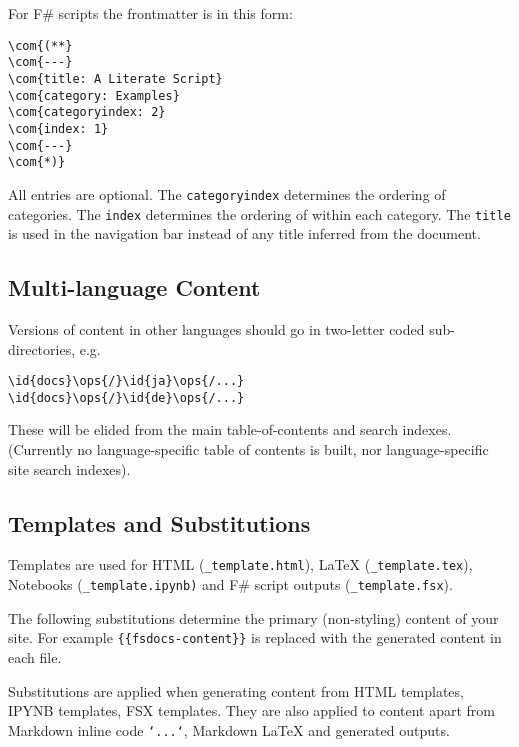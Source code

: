 \documentclass{article}
\newcommand{\id}[1]{\textcolor{black}{#1}}
\newcommand{\com}[1]{\textcolor{officegreen}{#1}}
\newcommand{\ops}[1]{\textcolor{purple}{#1}}
\begin{document}
For F\# scripts the frontmatter is in this form:
\begin{Verbatim}[commandchars=\\\{\}]
\com{(**}
\com{---}
\com{title: A Literate Script}
\com{category: Examples}
\com{categoryindex: 2}
\com{index: 1}
\com{---}
\com{*)}

\end{Verbatim}



All entries are optional.
The \texttt{categoryindex} determines the ordering of categories.
The \texttt{index} determines the ordering of within each category.
The \texttt{title} is used in the navigation bar instead of any title inferred from the document.
\subsection*{Multi-language Content}



Versions of content in other languages should go in two-letter coded sub-directories, e.g.
\begin{Verbatim}[commandchars=\\\{\}]
\id{docs}\ops{/}\id{ja}\ops{/...}
\id{docs}\ops{/}\id{de}\ops{/...}

\end{Verbatim}



These will be elided from the main table-of-contents and search indexes.  (Currently no language-specific
table of contents is built, nor language-specific site search indexes).
\subsection*{Templates and Substitutions}



Templates are used for HTML (\texttt{\_template.html}), LaTeX (\texttt{\_template.tex}), Notebooks (\texttt{\_template.ipynb)}
and F\# script outputs (\texttt{\_template.fsx}).


The following substitutions determine the primary (non-styling) content of your site.
For example \texttt{\{\{fsdocs-content\}\}} is replaced with the generated content in each file.


Substitutions are applied when generating content from HTML templates, IPYNB templates, FSX templates.
They are also applied to content apart from Markdown inline code \texttt{`...`}, Markdown LaTeX and
generated outputs.
\end{document}
